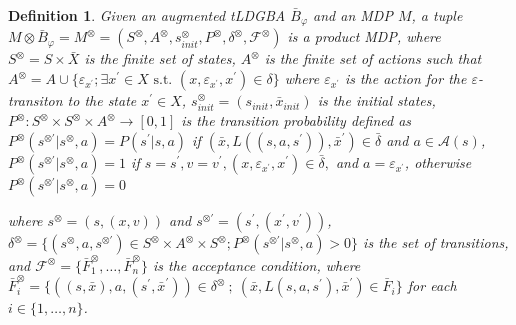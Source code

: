 \documentclass[letterpaper, 10 pt, conference]{ieeeconf}  %
\newtheorem{definition}{Definition}
\begin{document}
\begin{definition}
  Given an augmented tLDGBA $\bar{B}_{\varphi}$ and an MDP $M$, a tuple $M \otimes \bar{B}_{\varphi} = M^{\otimes} = (S^{\otimes}, A^{\otimes}, s_{init}^{\otimes}, P^{\otimes}, \delta^{\otimes}, {\mathcal F}^{\otimes})$ is a product MDP, where
  $S^{\otimes} = S \times \bar{X}$ is the finite set of states, $A^{\otimes}$  is the finite set of actions such that $A^{\otimes}=A \cup \{ \varepsilon_{x^{\prime}} ; \exists x^{\prime}\! \in \! X \text{ s.t. } (x,\varepsilon_{x^{\prime}}, x^{\prime}) \in \delta \}$ where $\varepsilon_{x^{\prime}}$ is the action for the $\varepsilon$-transiton to the state $x^{\prime}\! \in\! X$, $s_{init}^{\otimes} = (s_{init},\bar{x}_{init})$ is the initial states, $P^{\otimes} : S^{\otimes} \times S^{\otimes} \times A^{\otimes} \rightarrow [0,1]$ is the transition probability defined as $P^{\otimes}(s^{\otimes \prime} | s^{\otimes}, a) = P(s^{\prime} | s, a)$ if $ (\bar{x}, L((s,a,s^{\prime})), \bar{x}^{\prime}) \in \bar{\delta}$ and $ a \in \mathcal{A}(s)$, $P^{\otimes}(s^{\otimes \prime} | s^{\otimes}, a) = 1$ if $s\!=\!s^{\prime},v\!=\!v^{\prime},(x, \varepsilon_{x^{\prime}}, x^{\prime})\! \in \! \bar{\delta},$ and $ a=\varepsilon_{x^{\prime}}$, otherwise $P^{\otimes}(s^{\otimes \prime} | s^{\otimes}, a) = 0$

  where $s^{\otimes}=(s,(x,v))$ and $s^{\otimes \prime}=(s^{\prime},(x^{\prime},v^{\prime}))$,
  $\delta^{\otimes} = \{ (s^{\otimes}, a, s^{\otimes \prime}) \in S^{\otimes} \times A^{\otimes} \times S^{\otimes} ; P^{\otimes}(s^{\otimes \prime} | s^{\otimes}, a) > 0 \}$ is the set of transitions, and ${\mathcal F}^{\otimes} = \{ \bar{F}^{\otimes}_1, \ldots ,\bar{F}^{\otimes}_n \}$ is the acceptance condition, where $\bar{F}^{\otimes}_i = \{ ((s,\bar{x}), a, (s^{\prime}, \bar{x}^{\prime})) \in \delta^{\otimes}\ ;\ (\bar{x}, L(s,a,s^{\prime}), \bar{x}^{\prime}) \in \bar{F}_i \}$ for each $ i \in \{ 1, \ldots ,n \}$.

\end{definition}
\end{document}
